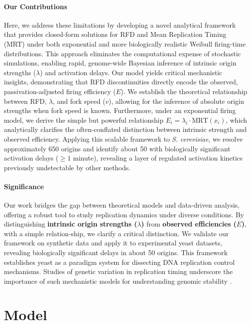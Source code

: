 \documentclass[10pt,a4paper]{revtex4-2}
\begin{document}
\paragraph*{Our Contributions}
Here, we address these limitations by developing a novel analytical 
framework that provides closed-form solutions for RFD and Mean Replication Timing (MRT) 
under both exponential and more biologically realistic Weibull firing-time distributions.
This approach eliminates the computational expense of stochastic simulations, 
enabling rapid, genome-wide Bayesian inference of intrinsic origin strengths ($\lambda$) 
and activation delays. 
Our model yields critical mechanistic insights, demonstrating that 
RFD discontinuities directly encode the observed, passivation-adjusted firing efficiency ($E$).
We establish the theoretical relationship between RFD, $\lambda$, and fork speed ($v$), 
allowing for the inference of absolute origin strengths when fork speed is known. 
Furthermore, under an exponential firing model, we derive the simple but powerful relationship 
$E_i = \lambda_i \cdot \text{MRT}(x_i)$, which analytically clarifies the often-conflated distinction
between intrinsic strength and observed efficiency. 
Applying this scalable framework to \textit{S. cerevisiae},
we resolve approximately 650 origins and identify about 50 with biologically significant activation
delays ($\geq 1$ minute), revealing a layer of regulated activation kinetics previously undetectable
by other methods.

\paragraph*{Significance}
Our work bridges the gap between theoretical models and data-driven analysis, 
offering a robust tool to study replication dynamics under diverse conditions. 
By distinguishing \textbf{intrinsic origin strengths (\(\lambda\))} from \textbf{observed efficiencies (\(E\))},
with a simple relation-ship, we clarify a critical distinction. 
We validate our framework on synthetic data and apply it to experimental yeast datasets,
revealing biologically significant delays in about 50 origins. 
This framework establishes yeast as a paradigm system for dissecting DNA replication control mechanisms.
Studies of genetic variation in replication timing underscore the importance of such mechanistic models
for understanding genomic stability \cite{Koren2014}.

\section{Model}
\end{document}
